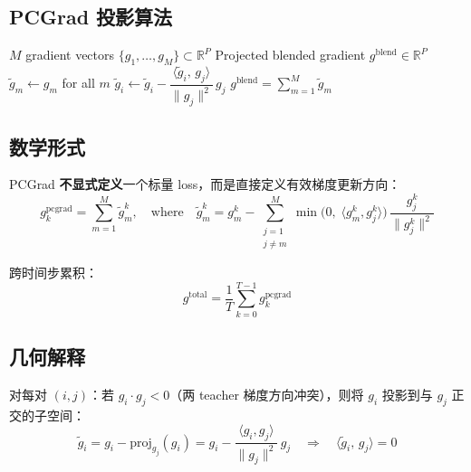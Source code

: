 \documentclass[11pt,a4paper]{article}
\newcommand{\R}{\mathbb{R}}
\theoremstyle{definition}
\begin{document}
\subsection{PCGrad 投影算法}

\begin{algorithm}[H]
\caption{PCGrad Projection in Parameter Space}
\label{alg:pcgrad}
\begin{algorithmic}[1]
\Require $M$ gradient vectors $\{g_1, \ldots, g_M\} \subset \R^P$
\Ensure Projected blended gradient $g^{\mathrm{blend}} \in \R^P$
\State $\tilde{g}_m \gets g_m$ for all $m$
         
            \State $\tilde{g}_i \gets \tilde{g}_i - \dfrac{\langle \tilde{g}_i,\, g_j \rangle}{\|g_j\|^2}\, g_j$ 
        \EndIf
    \EndFor
\EndFor
\State \Return $g^{\mathrm{blend}} = \sum_{m=1}^M \tilde{g}_m$
\end{algorithmic}
\end{algorithm}

\subsection{数学形式}

PCGrad \textbf{不显式定义}一个标量 loss，而是直接定义有效梯度更新方向：
\begin{equation}
\boxed{
g_k^{\mathrm{pcgrad}} = \sum_{m=1}^M \tilde{g}_m^k,
\quad\text{where}\quad
\tilde{g}_m^k = g_m^k - \sum_{\substack{j=1\\j\neq m}}^M \min\!\bigl(0,\;\langle g_m^k, g_j^k\rangle\bigr)\,\frac{g_j^k}{\|g_j^k\|^2}
}
\label{eq:pcgrad_grad}
\end{equation}

跨时间步累积：
\begin{equation}
g^{\mathrm{total}} = \frac{1}{T}\sum_{k=0}^{T-1} g_k^{\mathrm{pcgrad}}
\label{eq:pcgrad_total}
\end{equation}

\subsection{几何解释}

对每对 $(i,j)$：若 $g_i \cdot g_j < 0$（两 teacher 梯度方向冲突），则将 $g_i$ 投影到与 $g_j$ 正交的子空间：
\begin{equation}
\tilde{g}_i = g_i - \mathrm{proj}_{g_j}(g_i) = g_i - \frac{\langle g_i, g_j\rangle}{\|g_j\|^2}\,g_j
\quad\Longrightarrow\quad \langle \tilde{g}_i,\, g_j\rangle = 0
\end{equation}
\end{document}
